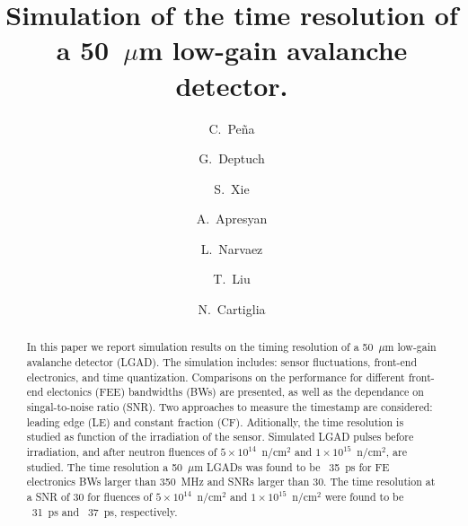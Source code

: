 \documentclass[preprint,1p]{elsarticle}
\begin{document}
\linenumbers

\begin{frontmatter}



\title{Simulation of the time resolution of a 50~$\mu$m low-gain avalanche detector.}


\author[1,2]{C.~Pe\~na}
\author[1]{G.~Deptuch}
\author[2]{S.~Xie}
\author[1]{A.~Apresyan}
\author[2]{L.~Narvaez}
\author[1]{T.~Liu}
\author[3]{N.~Cartiglia}


\address[1]{Fermi National Accelerator Laboratory, Batavia, IL, USA}
\address[2]{California Institute of Technology, Pasadena, CA, USA}
\address[3]{INFN, Torino, Italy}

\begin{abstract}
In this paper we report simulation results on the timing resolution of a 50~$\mu$m low-gain avalanche detector (LGAD).
The simulation includes: sensor fluctuations, front-end electronics, and time quantization.
Comparisons on the performance for different front-end electonics (FEE) bandwidths (BWs) are presented, as well as
the dependance on singal-to-noise ratio (SNR).
Two approaches to measure the timestamp are considered: leading edge (LE) and constant fraction (CF).
Aditionally, the time resolution is studied as function of the irradiation of the sensor.
Simulated LGAD pulses before irradiation, and after neutron fluences of
 $5\times 10^{14}$~n/cm$^2$ and $1\times 10^{15}$~n/cm$^2$, are studied.
 The time resolution a 50~$\mu$m LGADs was found to be ~35~\si{ps} for FE electronics BWs larger than 350~\si{MHz} and SNRs larger than 30.
 The time resolution at a SNR of 30 for fluences of $5\times 10^{14}$~n/cm$^2$ and $1\times 10^{15}$~n/cm$^2$ were found to be ~31~\si{ps}
  and ~37~\si{ps}, respectively.
\end{abstract}


\end{frontmatter}
\end{document}
